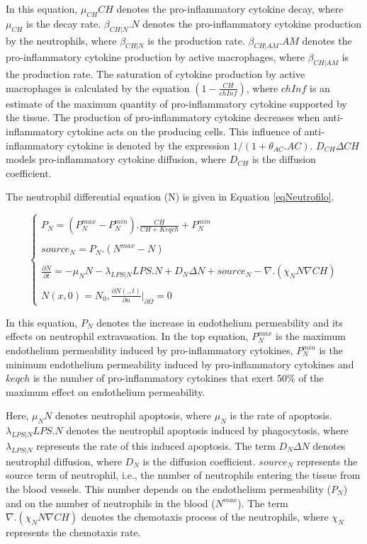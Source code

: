 \documentclass[10pt]{bmc_article}
\newenvironment{bmcformat}{\baselineskip20pt\sloppy\setboolean{publ}{false}}{\baselineskip20pt\sloppy}
\begin{document}
\begin{bmcformat}
In this equation, $\mu_{CH} CH$ denotes the pro-inflammatory cytokine decay, where $\mu_{CH}$ is the decay rate. 
$\beta _{CH|N}.N$ denotes the pro-inflammatory cytokine production by the neutrophils, where $\beta _{CH|N}$ is the production rate. 
$\beta _{CH|AM}.AM$ denotes the pro-inflammatory cytokine production by active macrophages, where $\beta _{CH|AM}$ is the production rate. 
The saturation of cytokine production by active macrophages is calculated by the equation $(1 - \frac{CH}{chInf})$, where $chInf$ is an 
estimate of the maximum quantity of pro-inflammatory cytokine supported by the tissue. 
The production of pro-inflammatory cytokine decreases when anti-inflammatory cytokine acts on the producing cells. 
This influence of anti-inflammatory cytokine is denoted by the expression $1/(1 + \theta_{AC}.AC)$. 
$D_{CH} \Delta CH$ models pro-inflammatory cytokine diffusion, where $D_{CH}$ is the diffusion coefficient. 

The neutrophil differential equation (N) is given in Equation \ref{eqNeutrofilo}.

\begin{equation}
 \begin{cases}   
P_{N} = (P^{max}_{N}- P^{min}_{N}).\frac{CH}{CH + Keqch} + P^{min}_{N}\\\\
source_{N} = P_{N}.(N^{max} - N)\\\\
\frac{\partial N}{\partial t} = -\mu_N N -\lambda _{LPS|N} LPS. N + D_N \Delta N + source_{N} - \nabla. (\chi_N N \nabla CH) \\\\
N(x,0) = N_0, \frac{\partial N(.,t)}{\partial n} |_{\partial\Omega} = 0 
\end{cases} 
\label{eqNeutrofilo}
\end{equation}

In this equation, $P_{N}$ denotes the increase in endothelium permeability and its effects on neutrophil extravasation. 
In the top equation, $P^{max}_{N}$ is the maximum endothelium permeability induced by pro-inflammatory cytokines, 
$P^{min}_{N}$ is the minimum endothelium permeability induced by pro-inflammatory cytokines and $keqch$ is the number of pro-inflammatory 
cytokines that exert $50\%$ of the maximum effect on endothelium permeability. 

Here, $\mu_N N$ denotes neutrophil apoptosis, where $\mu_N$ is the rate of apoptosis. $\lambda _{LPS|N} LPS. N$ denotes the neutrophil 
apoptosis induced by phagocytosis, where $\lambda _{LPS|N}$ represents the rate of this induced apoptosis. The term $D_N \Delta N$ denotes
neutrophil diffusion, where $D_N$ is the diffusion coefficient. $source_{N}$ represents the source term of neutrophil, i.e., the number of 
neutrophils entering the tissue from the blood vessels. This number depends on the endothelium permeability ($P_{N}$) and on the number of
neutrophils in the blood ($N^{max}$). The term $\nabla. (\chi_N N \nabla CH)$ denotes the chemotaxis process of the neutrophils, 
where $\chi_N$ represents the chemotaxis rate. 


\end{bmcformat}
\end{document}

